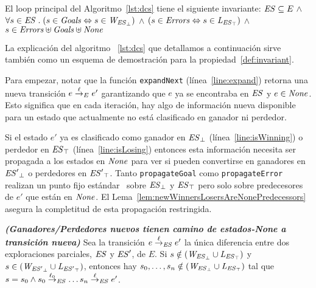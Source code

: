 \begin{property}[Invariante]
\label{def:invariant}
El loop principal del Algoritmo~\ref{lst:dcs} tiene el siguiente invariante: 
$\mathit{ES} \subseteq E \ \wedge $ $\forall s \in \mathit{ES} \;.\; (s\in\mathit{Goals} 
\Leftrightarrow 
s \in 
\mathit{W_{\mathit{{\mathit{ES}}_{\bot}}}})$ $\wedge$  $(s\in\mathit{Errors} 
\Leftrightarrow s \in \mathit{L_{\mathit{{\mathit{ES}}_{\top}}}})$ $\wedge$  
$s\in\mathit{Errors}\uplus\mathit{Goals}\uplus\mathit{None}$

\end{property}

La explicación del algoritmo ~\ref{lst:dcs} que detallamos a continuación sirve también como un esquema de demostración para la propiedad~\ref{def:invariant}.   

Para empezar, notar que la función \texttt{expandNext} 
(línea~\ref{line:expand}) retorna una nueva transición $e \overset{\ell}{\rightarrow}_{E} e'$ 
garantizando que $e$ ya se encontraba en $\mathit{ES}$ y $e \in \mathit{None}$. 
Esto significa que en cada iteración, hay algo de información nueva disponible para un estado que actualmente no está clasificado en ganador ni perdedor.

Si el estado $e'$ ya es clasificado como ganador en
$\mathit{{\mathit{ES}}_{\bot}}$ (línea~\ref{line:isWinning}) o
perdedor en $\mathit{{\mathit{ES}}_{\top}}$ (línea~\ref{line:isLosing}) 
entonces esta información necesita ser propagada a los estados en $\mathit{None}$ para ver si pueden convertirse en ganadores en 
$\mathit{{\mathit{ES}'}_{\bot}}$ o perdedores en
$\mathit{{\mathit{ES}'}_{\top}}$. Tanto \texttt{propagateGoal} como
\texttt{propagateError} realizan un punto fijo estándar~\cite{Ramadge:1989:CDES} sobre
$\mathit{{\mathit{ES}}_{\bot}}$ y
$\mathit{{\mathit{ES}}_{\top}}$ pero solo sobre predecesores de $e'$ que están en $\mathit{None}$. 
El Lema~\ref{lem:newWinnersLosersAreNonePredecessors} asegura la completitud de esta propagación restringida.

\begin{lemma}\textbf{\emph{(Ganadores/Perdedores nuevos tienen camino de estados-\textit{None} a \\ transición nueva)}}
\label{lem:newWinnersLosersAreNonePredecessors}
Sea la transición $e \overset{\ell}{\rightarrow}_{\mathit{ES}} e'$ la única diferencia entre dos exploraciones parciales, $\mathit{ES}$ y $\mathit{ES}'$, de $E$. Si $s \notin (\mathit{W_{\mathit{{\mathit{ES}}_{\bot}}}} \cup \mathit{L_{\mathit{{\mathit{ES}}_{\top}}}})$ y $s \in (\mathit{W_{\mathit{{\mathit{ES}'}_{\bot}}}} \cup \mathit{L_{\mathit{{\mathit{ES}'}_{\top}}}})$, entonces hay $s_0, \ldots, s_n \notin (\mathit{W_{\mathit{{\mathit{ES}}_{\bot}}}} \cup \mathit{L_{\mathit{{\mathit{ES}}_{\top}}}})$ tal que $s = s_0 \wedge
s_0 \overset{\ell_0}{\rightarrow}_{\mathit{ES}}\ldots s_{n} \overset{\ell}{\rightarrow}_{\mathit{ES}} e'$.
\end{lemma}

